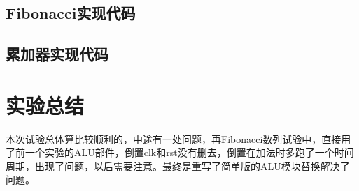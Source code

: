 \documentclass[12pt, a4paper]{article}
\begin{document}
\subsection{Fibonacci实现代码}




\clearpage
\subsection{累加器实现代码}




\clearpage

\section{实验总结}
本次试验总体算比较顺利的，中途有一处问题，再Fibonacci数列试验中，直接用了前一个实验的ALU部件，倒置clk和rst没有删去，倒置在加法时多跑了一个时间周期，出现了问题，以后需要注意。最终是重写了简单版的ALU模块替换解决了问题。
\end{document}
